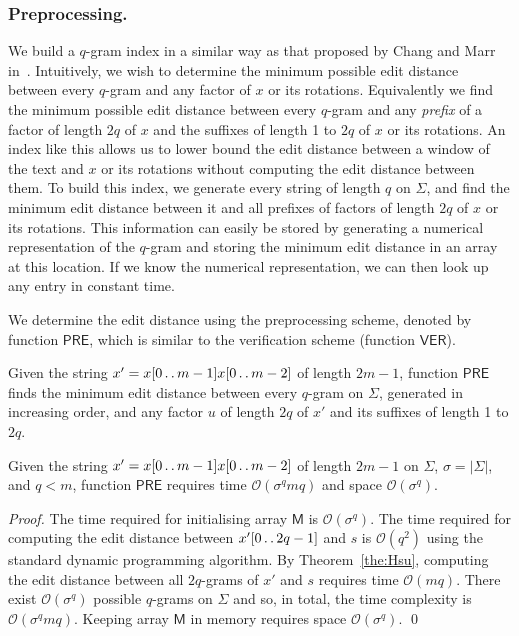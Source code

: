 \documentclass[runningheads, envcountsame, a4paper]{llncs}\usepackage{etex}
\def\dd{\mathinner{.\,.}}
\newcommand{\cO}{\mathcal{O}}
\begin{document}
\subsubsection*{Preprocessing.}
We build a $q$-gram index in a similar way as that proposed by Chang and Marr in~\cite{Chang}. Intuitively, we wish to determine the minimum possible edit distance between every $q$-gram and any factor of $x$ or its rotations. Equivalently we find the minimum possible edit distance between every $q$-gram and any {\em prefix} of a factor of length $2q$ of $x$ and the suffixes of length 1 to $2q$ of $x$ or its rotations. An index like this allows us to lower bound the edit distance between a window of the text and $x$ or its rotations without computing the edit distance between them. To build this index, we generate every string of length $q$ on $\Sigma$, and find the minimum edit distance between it and all prefixes of factors of length $2q$ of $x$ or its rotations. This information can easily be stored by generating a numerical representation of the $q$-gram and storing the minimum edit distance in an array at this location. If we know the numerical representation, we can then look up any entry in constant 
time. 

We determine the edit distance using the preprocessing scheme, denoted by function $\textsf{PRE}$, which is 
similar to the verification scheme (function $\textsf{VER}$). 

Given the string $x'=x[0\dd m-1]x[0 \dd m-2]$ of length $2m-1$, function $\textsf{PRE}$ finds the minimum edit distance between every $q$-gram on $\Sigma$, generated in increasing order, and any factor $u$ of length $2q$ of $x'$ and its suffixes of length 1 to $2q$.

\begin{lemma}\label{lemm:pre}
Given the string $x'=x[0\dd m-1]x[0 \dd m-2]$ of length $2m-1$ on $\Sigma$, $\sigma = |\Sigma|$, and $q < m$, 
function  $\textsf{PRE}$ requires time $\cO(\sigma^qmq)$ and space $\cO(\sigma^q)$.
\end{lemma}

\begin{proof}
The time required for initialising array $\textsf{M}$ is $\cO(\sigma^q)$.
The time required for computing the edit distance between $x'[0\dd 2q-1]$ and $s$ is $\cO(q^2)$ using the standard dynamic programming algorithm. 
By Theorem~\ref{the:Hsu}, computing the edit distance between all $2q$-grams of $x'$ and $s$ requires time $\cO(mq)$.
There exist $\cO(\sigma^q)$ possible $q$-grams on $\Sigma$ and so, in total, the time complexity is $\cO(\sigma^qmq)$. Keeping array $\textsf{M}$ in memory requires space $\cO(\sigma^q)$. \qed
\end{proof}
\end{document}
